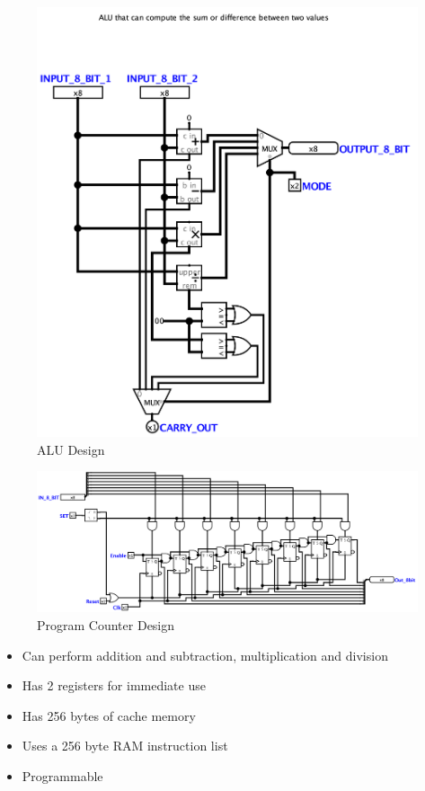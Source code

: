 \documentclass[12pt]{report}
\begin{document}
	\begin{figure}[!hbt]
		\centering
		\includegraphics[scale=0.05]{figures/ALU_8_BIT.png}
		\caption{ALU Design}
	\end{figure}

	\begin{figure}[!hbt]
		\centering
		\includegraphics[scale=0.05]{figures/PROG_COUNT.png}
		\caption{Program Counter Design}
	\end{figure}
	
	\FloatBarrier
	
	\begin{itemize}
		\item Can perform addition and subtraction, multiplication and division
		\item Has 2 registers for immediate use
		\item Has 256 bytes of cache memory
		\item Uses a 256 byte RAM instruction list
		\item Programmable
	\end{itemize}
\end{document}
